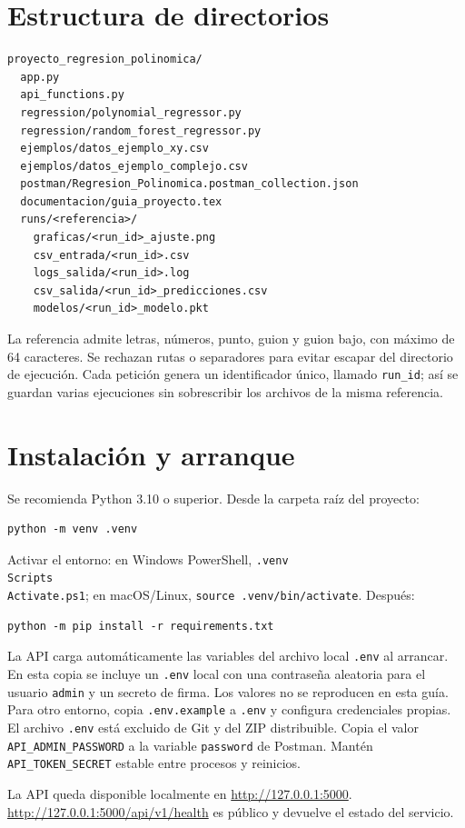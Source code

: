 \documentclass[11pt,a4paper]{article}
\begin{document}
\section{Estructura de directorios}
\begin{lstlisting}
proyecto_regresion_polinomica/
  app.py
  api_functions.py
  regression/polynomial_regressor.py
  regression/random_forest_regressor.py
  ejemplos/datos_ejemplo_xy.csv
  ejemplos/datos_ejemplo_complejo.csv
  postman/Regresion_Polinomica.postman_collection.json
  documentacion/guia_proyecto.tex
  runs/<referencia>/
    graficas/<run_id>_ajuste.png
    csv_entrada/<run_id>.csv
    logs_salida/<run_id>.log
    csv_salida/<run_id>_predicciones.csv
    modelos/<run_id>_modelo.pkt
\end{lstlisting}
La referencia admite letras, números, punto, guion y guion bajo, con máximo de 64 caracteres. Se rechazan rutas o separadores para evitar escapar del directorio de ejecución. Cada petición genera un identificador único, llamado \texttt{run\_id}; así se guardan varias ejecuciones sin sobrescribir los archivos de la misma referencia.

\section{Instalación y arranque}
Se recomienda Python 3.10 o superior. Desde la carpeta raíz del proyecto:
\begin{lstlisting}
python -m venv .venv
\end{lstlisting}
Activar el entorno: en Windows PowerShell, \texttt{.venv\\Scripts\\Activate.ps1}; en macOS/Linux, \texttt{source .venv/bin/activate}. Después:
\begin{lstlisting}
python -m pip install -r requirements.txt
\end{lstlisting}
La API carga automáticamente las variables del archivo local \texttt{.env} al arrancar. En esta copia se incluye un \texttt{.env} local con una contraseña aleatoria para el usuario \texttt{admin} y un secreto de firma. Los valores no se reproducen en esta guía. Para otro entorno, copia \texttt{.env.example} a \texttt{.env} y configura credenciales propias. El archivo \texttt{.env} está excluido de Git y del ZIP distribuible. Copia el valor \texttt{API\_ADMIN\_PASSWORD} a la variable \texttt{password} de Postman. Mantén \texttt{API\_TOKEN\_SECRET} estable entre procesos y reinicios.

La API queda disponible localmente en \url{http://127.0.0.1:5000}. \url{http://127.0.0.1:5000/api/v1/health} es público y devuelve el estado del servicio.
\end{document}
